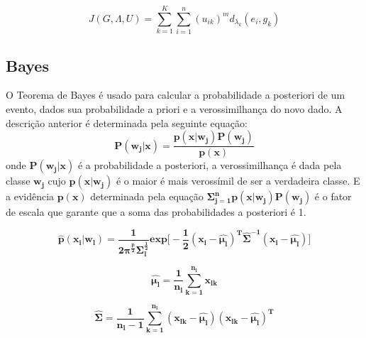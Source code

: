 \documentclass[12pt]{article}
\begin{document}
$$
J(G,\Lambda,U) = \sum_{k=1}^{K}\sum_{i=1}^{n} (u_{ik})^m d_{\lambda_{k}}(e_i,g_k)
$$





\subsection{Bayes}
O Teorema de Bayes é usado para calcular a probabilidade a posteriori de um evento, dados sua probabilidade a priori e a verossimilhança do novo dado. A descrição anterior é determinada pela seguinte equação:
\begin{equation}
\mathbf{P(w_j\vert x)= \dfrac{p(x\vert w_j) P(w_j)}{p(x)} }
\end{equation}
onde $\mathbf{P(w_j\vert x)}$ é a probabilidade a posteriori, a verossimilhança  é dada pela classe $\mathbf{w_j}$ cujo $\mathbf{p(x\vert w_j)}$ é o maior é mais verossímil de ser a verdadeira classe. E a evidência $\mathbf{p(x)}$ determinada pela equação $\mathbf{\Sigma_{j=1}^{n} p(x\vert w_j) P(w_j)}$ é o fator de escala que garante que a
soma das probabilidades a posteriori é 1.

\begin{equation}
\mathbf{\hat{p}(x_i\vert w_l)= \dfrac{1}{2\pi^\frac{p}{2}\Sigma_{l}^{\frac{1}{2}}}exp\Bigg[ -\frac{1}{2}(x_i- \hat{\mu_{l}})^{T}\hat{\Sigma}^{-1}(x_i-\hat{\mu_{l}}) \Bigg ]  }
\end{equation}

\begin{equation}
\mathbf{\hat{\mu_{l}}= \dfrac{1}{n_l} \sum_{k=1}^{n_l} x_{lk} }
\end{equation}

\begin{equation}
\mathbf{\hat{\Sigma}= \dfrac{1}{n_l-1} \sum_{k=1}^{n_l} (x_{lk}-\hat{\mu_l}) (x_{lk}-\hat{\mu_l})^T }
\end{equation}
\end{document}
